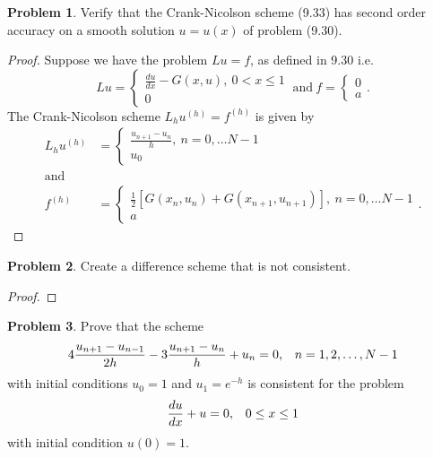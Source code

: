 \documentclass[12pt]{article}
\theoremstyle{definition}
\newtheorem{problem}{Problem}
\begin{document}
\begin{problem} Verify that the Crank-Nicolson scheme (9.33) has second order
  accuracy on a smooth solution $u=u(x)$ of problem (9.30).
\end{problem}

\begin{proof}
  Suppose we have the problem $Lu = f$, as defined in 9.30 i.e.
  \[
      Lu =
      \begin{cases}
        \frac{du}{dx} - G(x, u),\ 0 < x \leq 1 \\
        0
      \end{cases}
      \ \text{and} \
      f =
      \begin{cases}
        0 \\
        a
      \end{cases}.
  \]
  The Crank-Nicolson scheme $L_hu^{(h)} = f^{(h)}$ is given by
  \begin{align*}
      L_hu^{(h)} &=
      \begin{cases}
        \frac{u_{n+1} - u_{n}}{h},\  n = 0, \dots N-1 \\
        u_0
      \end{cases}
      \\ \text{and} \\
      f^{(h)} &=
      \begin{cases}
         \frac{1}{2}[G(x_n, u_n) + G(x_{n+1}, u_{n+1})],\  n = 0, \dots N-1 \\
        a
      \end{cases}.
  \end{align*}

\end{proof}


\begin{problem}
  Create a difference scheme that is not consistent.
\end{problem}

\begin{proof}
\end{proof}


\begin{problem}
  Prove that the scheme
  \[
    4 \frac{u_{n+1} - u_{n-1}}{2h} - 3 \frac{u_{n+1} - u_n}{h} + u_n = 0\text{,\quad $n = 1, 2, \dots, N-1$}
  \]
  with initial conditions $u_0 = 1$ and $u_1 = e^{-h}$ is consistent for the problem
  \[
    \frac{du}{dx} + u = 0\text{,\quad $0 \leq x \leq 1$}
  \]
  with initial condition $u(0) = 1$.
\end{problem}
\end{document}
